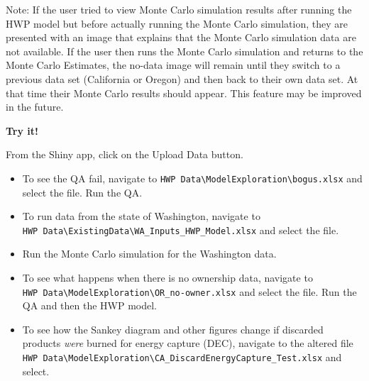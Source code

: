 \documentclass[
  openany]{book}
\providecommand{\tightlist}{%
  \setlength{\itemsep}{0pt}\setlength{\parskip}{0pt}}
\begin{document}
Note: If the user tried to view Monte Carlo simulation results after running the HWP model but before actually running the Monte Carlo simulation, they are presented with an image that explains that the Monte Carlo simulation data are not available. If the user then runs the Monte Carlo simulation and returns to the Monte Carlo Estimates, the no-data image will remain until they switch to a previous data set (California or Oregon) and then back to their own data set. At that time their Monte Carlo results should appear. This feature may be improved in the future.

\begin{greybox}

\begin{minipage}{.85\linewidth}

\begin{center}
\textbf{Try it!}

\end{center}

From the Shiny app, click on the Upload Data button.

\begin{itemize}
\tightlist
\item
  To see the QA fail, navigate to \texttt{HWP\ Data\textbackslash{}ModelExploration\textbackslash{}bogus.xlsx} and select the file. Run the QA.\\
\item
  To run data from the state of Washington, navigate to \texttt{HWP\ Data\textbackslash{}ExistingData\textbackslash{}WA\_Inputs\_HWP\_Model.xlsx} and select the file.\\
\item
  Run the Monte Carlo simulation for the Washington data.
\item
  To see what happens when there is no ownership data, navigate to \texttt{HWP\ Data\textbackslash{}ModelExploration\textbackslash{}OR\_no-owner.xlsx} and select the file. Run the QA and then the HWP model.\\
\item
  To see how the Sankey diagram and other figures change if discarded products \emph{were} burned for energy capture (DEC), navigate to the altered file
  \texttt{HWP\ Data\textbackslash{}ModelExploration\textbackslash{}CA\_DiscardEnergyCapture\_Test.xlsx} and select.
\end{itemize}

\end{minipage}

\end{greybox}
\end{document}
